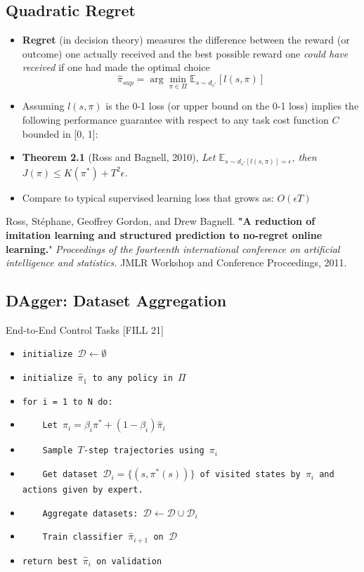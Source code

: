 \documentclass[10pt]{article}
\begin{document}
\subsection*{Quadratic Regret}
\begin{itemize}
	\item \textbf{Regret} (in decision theory) measures the difference between the reward (or outcome) one actually received and the best possible reward one \textit{could have received} if one had made the optimal choice
	\[\hat{\pi}_{sup} = \arg \min_{\pi \in \Pi} \mathbb{E}_{s \sim d_{s^*}} [l(s, \pi)]\]
    \item Assuming $l(s, \pi)$ is the 0-1 loss (or upper bound on the 0-1 loss) implies the following performance guarantee with respect to any task cost function $C$ bounded in [0, 1]:
    \item \textbf{Theorem 2.1} (Ross and Bagnell, 2010), \textit{Let $\mathbb{E}_{s \sim d_{s^*} [l(s, \pi)] = \epsilon}$, then $J(\pi) \leq K(\pi^*) + T^2 \epsilon$.}
    \item Compare to typical supervised learning loss that grows as: $O(\epsilon T)$    
\end{itemize}
Ross, Stéphane, Geoffrey Gordon, and Drew Bagnell. \textbf{"A reduction of imitation learning and structured prediction to no-regret online learning.}" \textit{Proceedings of the fourteenth international conference on artificial intelligence and statistics.} JMLR Workshop and Conference Proceedings, 2011.

\subsection*{DAgger: Dataset Aggregation}
End-to-End Control Tasks
[FILL 21]

\begin{itemize}[label={~}]
    \item \texttt{initialize $\mathcal{D} \leftarrow \emptyset$}
    \item \texttt{initialize $\hat{\pi}_1$ to any policy in $\Pi$}
    \item \texttt{for i = 1 to N do:}
    \item \texttt{~~~~Let $\pi_i = \beta_i \pi^* + (1 - \beta_i) \hat{\pi}_i$}
    \item \texttt{~~~~Sample $T$-step trajectories using $\pi_i$}
    \item \texttt{~~~~Get dataset $\mathcal{D}_i = \{(s, \pi^*(s))\}$ of visited states by $\pi_i$ and actions given by expert.}
    \item \texttt{~~~~Aggregate datasets: $\mathcal{D} \leftarrow \mathcal{D} \cup \mathcal{D}_i$}
    \item \texttt{~~~~Train classifier $\hat{\pi}_{i + 1}$ on $\mathcal{D}$}
    \item \texttt{return best $\hat{\pi}_i$ on validation}
\end{itemize}
\end{document}
